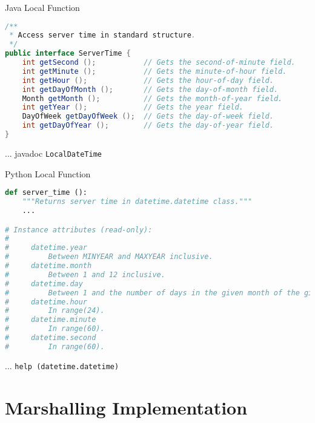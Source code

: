 \begin{frame}[fragile]{Java Local Function}
\begin{lstlisting}[language=java,style=mini]
/**
 * Access server time in standard structure.
 */
public interface ServerTime {
    int getSecond ();           // Gets the second-of-minute field.
    int getMinute ();           // Gets the minute-of-hour field.
    int getHour ();             // Gets the hour-of-day field.
    int getDayOfMonth ();       // Gets the day-of-month field.
    Month getMonth ();          // Gets the month-of-year field.
    int getYear ();             // Gets the year field.
    DayOfWeek getDayOfWeek ();  // Gets the day-of-week field.
    int getDayOfYear ();        // Gets the day-of-year field.
}
\end{lstlisting}
    \hfill ... javadoc \lstinline{LocalDateTime}
\end{frame}


\begin{frame}[fragile]{Python Local Function}
\begin{lstlisting}[language=python,style=mini]
def server_time ():
    """Returns server time in datetime.datetime class."""
    ...

# Instance attributes (read-only):
#
#     datetime.year
#         Between MINYEAR and MAXYEAR inclusive.
#     datetime.month
#         Between 1 and 12 inclusive.
#     datetime.day
#         Between 1 and the number of days in the given month of the given year.
#     datetime.hour
#         In range(24).
#     datetime.minute
#         In range(60).
#     datetime.second
#         In range(60).
\end{lstlisting}
    \hfill ... \lstinline{help (datetime.datetime)}
\end{frame}


\section{Marshalling Implementation}


